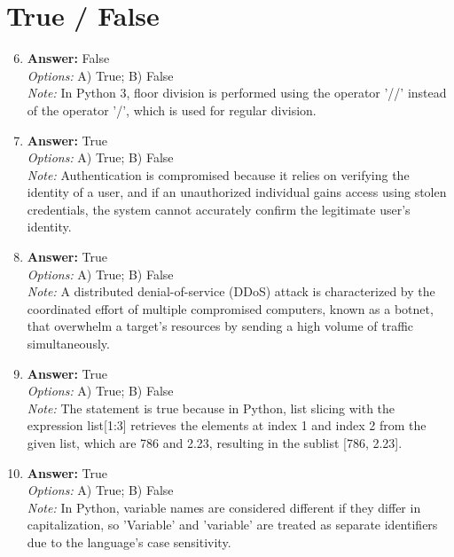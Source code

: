 \documentclass[12pt]{article}
\begin{document}
\section*{True / False}
\begin{enumerate}[label=\arabic*.]
\setcounter{enumi}{5}
\item \textbf{Answer:} False
\\ \textit{Options:} A) True; B) False
\\ \textit{Note:} In Python 3, floor division is performed using the operator '//' instead of the operator '/', which is used for regular division.
\item \textbf{Answer:} True
\\ \textit{Options:} A) True; B) False
\\ \textit{Note:} Authentication is compromised because it relies on verifying the identity of a user, and if an unauthorized individual gains access using stolen credentials, the system cannot accurately confirm the legitimate user's identity.
\item \textbf{Answer:} True
\\ \textit{Options:} A) True; B) False
\\ \textit{Note:} A distributed denial-of-service (DDoS) attack is characterized by the coordinated effort of multiple compromised computers, known as a botnet, that overwhelm a target's resources by sending a high volume of traffic simultaneously.
\item \textbf{Answer:} True
\\ \textit{Options:} A) True; B) False
\\ \textit{Note:} The statement is true because in Python, list slicing with the expression list[1:3] retrieves the elements at index 1 and index 2 from the given list, which are 786 and 2.23, resulting in the sublist [786, 2.23].
\item \textbf{Answer:} True
\\ \textit{Options:} A) True; B) False
\\ \textit{Note:} In Python, variable names are considered different if they differ in capitalization, so 'Variable' and 'variable' are treated as separate identifiers due to the language's case sensitivity.
\end{enumerate}
\end{document}
